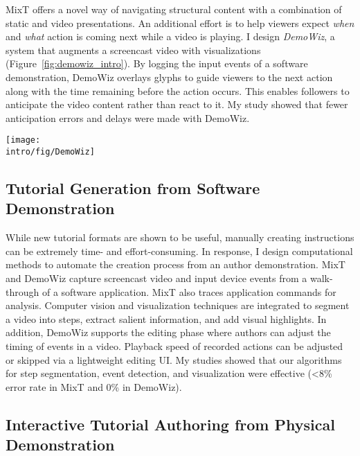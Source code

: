 
MixT offers a novel way of navigating structural content with a combination of static and video presentations. An additional effort is to help viewers expect \emph{when} and \emph{what} action is coming next while a video is playing. I design \emph{DemoWiz}, a system that augments a screencast video with visualizations (Figure~\ref{fig:demowiz_intro}). By logging the input events of a software demonstration, DemoWiz overlays glyphs to guide viewers to the next action along with the time remaining before the action occurs. This enables followers to anticipate the video content rather than react to it.
%
My study showed that fewer anticipation errors and delays were made with DemoWiz.

\begin{figure*}[t]
\centering
\texttt{[image: \\intro/fig/DemoWiz]}
\caption{DemoWiz visualizes input events in a screencast video to help viewers anticipate the upcoming event for narrating a software demonstration in a live presentation.}
\label{fig:demowiz_intro}
\end{figure*}

\subsection{Tutorial Generation from Software Demonstration}

While new tutorial formats are shown to be useful, manually creating instructions can be extremely time- and effort-consuming. In response, I design computational methods to automate the creation process from an author demonstration. MixT and DemoWiz capture screencast video and input device events from a walk-through of a software application. MixT also traces application commands for analysis. Computer vision and visualization techniques are integrated to segment a video into steps, extract salient information, and add visual highlights.
%
In addition, DemoWiz supports the editing phase where authors can adjust the timing of events in a video. Playback speed of recorded actions can be adjusted or skipped via a lightweight editing UI. My studies showed that our algorithms for step segmentation, event detection, and visualization were effective (\textless8\% error rate in MixT and 0\% in DemoWiz).

\subsection{Interactive Tutorial Authoring from Physical Demonstration}

